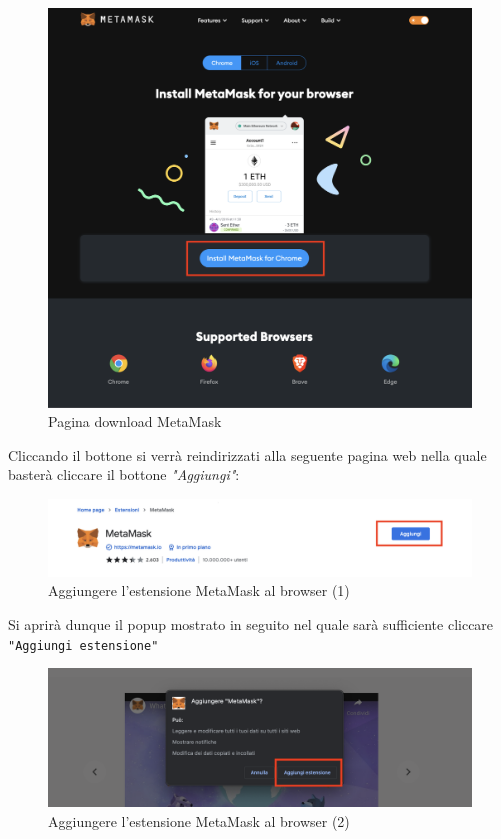 \begin{figure}[H]
    \centering
    \includegraphics[scale=0.3]{immagini/install-MetaMask.png}
    \caption{Pagina download MetaMask}
\end{figure}

Cliccando il bottone si verrà reindirizzati alla seguente pagina web nella quale basterà cliccare il bottone \textit{"Aggiungi"}:

\begin{figure}[H]
    \centering
    \includegraphics[scale=0.3]{immagini/MetaMaskExtensionPage.png}
    \caption{Aggiungere l'estensione MetaMask al browser (1)}
\end{figure}

Si aprirà dunque il popup mostrato in seguito nel quale sarà sufficiente cliccare \texttt{"Aggiungi estensione"}


\begin{figure}[H]
    \centering
    \includegraphics[scale=0.3]{immagini/AddExtenction.png}
    \caption{Aggiungere l'estensione MetaMask al browser (2)}
\end{figure}


